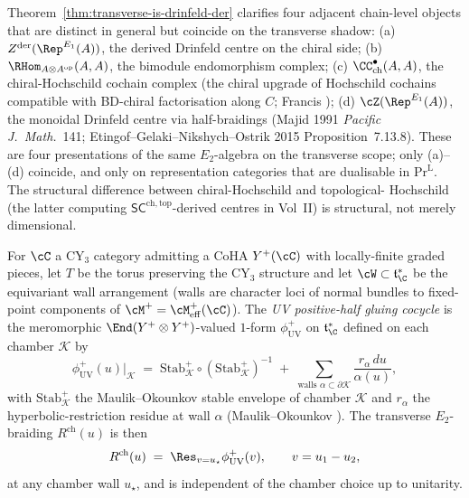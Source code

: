 \begin{remark}
\label{rem:longitudinal-transverse-disambiguation}
Theorem~\ref{thm:transverse-is-drinfeld-der} clarifies four
adjacent chain-level objects that are distinct in general but
coincide on the transverse shadow:
(a) $Z^{\mathrm{der}}(\Rep^{E_1}(A))$, the derived Drinfeld centre on
the chiral side;
(b) $\RHom_{A \otimes A^{\mathrm{op}}}(A, A)$, the bimodule
endomorphism complex;
(c) $\CC^\bullet_{\mathrm{ch}}(A, A)$, the chiral-Hochschild cochain
complex (the chiral upgrade of Hochschild cochains compatible with
BD-chiral factorisation along $C$; Francis \cite[\S 2]{Francis2013});
(d) $\cZ(\Rep^{E_1}(A))$, the monoidal Drinfeld centre via
half-braidings (Majid 1991 \emph{Pacific J.~Math.}~141;
Etingof--Gelaki--Nikshych--Ostrik 2015 Proposition~7.13.8).
These are four presentations of the same $E_2$-algebra on the
transverse scope; only (a)--(d) coincide, and only on representation
categories that are dualisable in $\mathrm{Pr}^{\mathrm L}$. The
structural difference between chiral-Hochschild and topological-
Hochschild (the latter computing
$\mathsf{SC}^{\mathrm{ch,top}}$-derived centres in Vol~II) is structural,
not merely dimensional.
\end{remark}

\begin{construction}
\label{constr:transverse-r-matrix-cocycle}
For $\cC$ a CY$_3$ category admitting a CoHA $Y^+(\cC)$ with
locally-finite graded pieces, let $T$ be the torus preserving the
CY$_3$ structure and let $\cW \subset \mathfrak{t}^*_\C$ be the
equivariant wall arrangement (walls are character loci of normal
bundles to fixed-point components of $\cM^+ = \cM^+_{\mathrm{eff}}
(\cC)$). The \emph{UV positive-half gluing cocycle} is the
meromorphic $\End(Y^+ \otimes Y^+)$-valued $1$-form
$\phi^+_{\mathrm{UV}}$ on $\mathfrak{t}^*_\C$ defined on each chamber
$\mathcal{K}$ by
\[
 \phi^+_{\mathrm{UV}}(u) \Big|_{\mathcal{K}}
 \;=\;
 \mathrm{Stab}_{\mathcal{K}}^+
 \circ (\mathrm{Stab}_{\mathcal{K}}^+)^{-1}
 \;+\;
 \sum_{\text{walls } \alpha \subset \partial \mathcal{K}}
 \frac{r_\alpha \, du}{\alpha(u)},
\]
with $\mathrm{Stab}_{\mathcal{K}}^+$ the Maulik--Okounkov stable
envelope of chamber $\mathcal{K}$ and $r_\alpha$ the
hyperbolic-restriction residue at wall $\alpha$
(Maulik--Okounkov \cite[\S 4]{MaulikOkounkov2012}). The transverse
$E_2$-braiding $R^{\mathrm{ch}}(u)$ is then
\[
 R^{\mathrm{ch}}(u) \;=\; \Res_{v = u_\star}
 \phi^+_{\mathrm{UV}}(v),
 \qquad v = u_1 - u_2,
\]
at any chamber wall $u_\star$, and is independent of the chamber
choice up to unitarity.
\end{construction}

